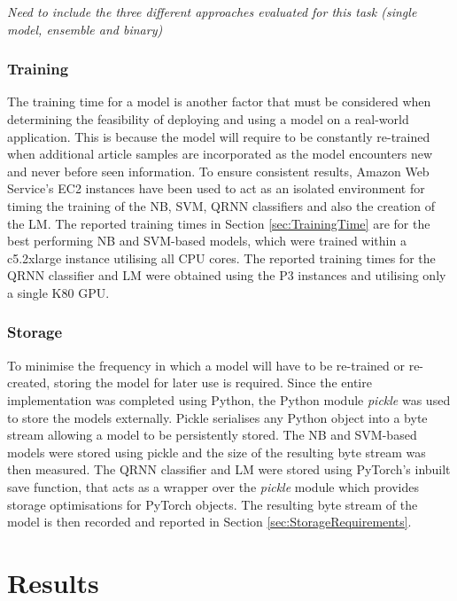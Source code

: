 \documentclass[a4paper,twoside,phd]{BYUPhys}
\begin{document}
\textit{Need to include the three different approaches evaluated for this task (single model, ensemble and binary)}

\subsection{Training}
\label{sec:TrainingExperiments}
The training time for a model is another factor that must be considered when determining the feasibility of deploying and using a model on a real-world application. This is because the model will require to be constantly re-trained when additional article samples are incorporated as the model encounters new and never before seen information. To ensure consistent results, Amazon Web Service's EC2 instances \cite{AWS} have been used to act as an isolated environment for timing the training of the NB, SVM, QRNN classifiers and also  the creation of the LM. The reported training times in Section \ref{sec:TrainingTime} are for the best performing NB and SVM-based models, which were trained within a c5.2xlarge instance utilising all CPU cores. The reported training times for the QRNN classifier and LM were obtained using the P3 instances and utilising only a single K80 GPU.


\subsection{Storage}
\label{sec:StorageExperiments}
To minimise the frequency in which a model will have to be re-trained or re-created, storing the model for later use is required. Since the entire implementation was completed using Python, the Python module \textit{pickle} was used to store the models externally. Pickle serialises any Python object into a byte stream allowing a model to be persistently stored. The NB and SVM-based models were stored using pickle and the size of the resulting byte stream was then measured. The QRNN classifier and LM were stored using PyTorch's inbuilt save function, that acts as a wrapper over the \textit{pickle} module which provides storage optimisations for PyTorch objects. The resulting byte stream of the model is then recorded and reported in Section \ref{sec:StorageRequirements}.



\chapter{Results}
\label{chap:Results}
\end{document}
